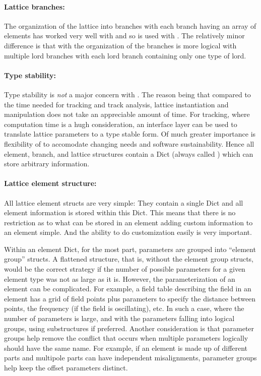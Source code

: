 \paragraph{Lattice branches:}
The organization of the lattice into branches with each branch having an array of elements has
worked very well with \bmad and so is used with \accellat. The relatively minor difference is
that with \accellat the organization of the branches is more logical with multiple lord branches
with each lord branch containing only one type of lord.

\paragraph{Type stability:}
Type stability is {\em not} a major concern with \accellat. The reason being that compared to
the time needed for tracking and track analysis, lattice instantiation
and manipulation does not take an appreciable amount of time. For tracking, where computation time
is a hugh consideration, an interface layer can be
used to translate lattice parameters to a type stable form. Of much greater importance is
flexibility of \accellat to accomodate changing needs and software sustainability. 
Hence all element, branch, and lattice structures contain a Dict (always called ) which
can store arbitrary information.

\paragraph{Lattice element structure:}
All lattice element structs are very simple: They contain a single Dict and all element information
is stored within this Dict. This means that there is no restriction as to what can be stored
in an element adding custom information to an element simple. 
And the ability to do customization easily is very important. 

Within an element Dict, for the most part, parameters are grouped into ``element group'' structs. 
A flattened structure, that is, without the element group structs, would be the correct strategy
if the number of possible parameters for a given element type was not as large as it is. 
However, the parameterization of an element can be complicated. 
For example, a field table describing the field in an element has a grid of field points plus 
parameters to specify the distance between points, the frequency (if the field is oscillating), etc.
In such a case, where the number of parameters is large, and with the parameters falling into 
logical groups, using substructures if preferred. Another consideration is that parameter groups
help remove the conflict that occurs when multiple parameters logically should have the same name.
For example, if an element is made up of different parts and multipole parts can have independent
misalignments, parameter groups help keep the offset parameters distinct. 

